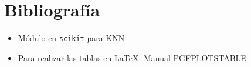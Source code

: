 \documentclass[11pt,leqno]{article}
\begin{document}
\section{Bibliografía}
\begin{itemize}
\item \href{http://scikit-learn.org/stable/modules/neighbors.html}{Módulo en \texttt{scikit} para KNN}
\item Para realizar las tablas en \LaTeX: \href{https://www.complang.tuwien.ac.at/doc/texlive-pictures-doc/latex/pgfplots/pgfplotstable.pdf}{Manual PGFPLOTSTABLE}
\end{itemize}
\end{document}
